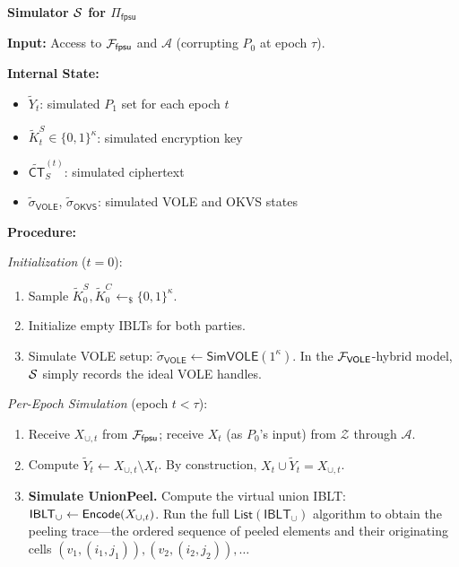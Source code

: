 \documentclass[letterpaper,twocolumn,10pt]{article}
\theoremstyle{definition}
\newcommand{\cA}{\mathcal{A}}\newcommand{\cB}{\mathcal{B}}\newcommand{\cZ}{\mathcal{Z}}
\newcommand{\List}{\mathsf{List}}\newcommand{\uPeel}{\mathsf{uPeel}}
\newcommand{\sample}{\leftarrow_{\$}}\newcommand{\concat}{\|}
\begin{document}
\begin{framed}
\noindent\textbf{Simulator $\mathcal{S}$ for $\Pi_{\mathsf{fpsu}}$}

\smallskip\noindent\textbf{Input:} Access to $\mathcal{F}_{\mathsf{fpsu}}$ and
$\cA$ (corrupting $P_0$ at epoch $\tau$).

\smallskip\noindent\textbf{Internal State:}
\begin{itemize}
\item $\tilde{Y}_t$: simulated $P_1$ set for each epoch $t$
\item $\tilde{K}^S_t \in \{0,1\}^\kappa$: simulated encryption key
\item $\widetilde{\mathsf{CT}}^{(t)}_S$: simulated ciphertext
\item $\tilde{\sigma}_{\mathsf{VOLE}}$, $\tilde{\sigma}_{\mathsf{OKVS}}$:
simulated VOLE and OKVS states
\end{itemize}

\smallskip\noindent\textbf{Procedure:}

\smallskip\noindent\textit{Initialization} ($t = 0$):
\begin{enumerate}
\item Sample $\tilde{K}^S_0, \tilde{K}^C_0 \sample \{0,1\}^\kappa$.
\item Initialize empty IBLTs for both parties.
\item Simulate VOLE setup: $\tilde{\sigma}_{\mathsf{VOLE}} \leftarrow
\textsf{SimVOLE}(1^\kappa)$. In the $\mathcal{F}_{\mathsf{VOLE}}$-hybrid model,
$\mathcal{S}$ simply records the ideal VOLE handles.
\end{enumerate}

\smallskip\noindent\textit{Per-Epoch Simulation} (epoch $t < \tau$):
\begin{enumerate}
\item Receive $X_{\cup,t}$ from $\mathcal{F}_{\mathsf{fpsu}}$; receive $X_t$ (as
$P_0$'s input) from $\cZ$ through $\cA$.
\item Compute $\tilde{Y}_t \leftarrow X_{\cup,t} \setminus X_t$. By
construction, $X_t \cup \tilde{Y}_t = X_{\cup,t}$.
\item \textbf{Simulate UnionPeel.} Compute the virtual union IBLT:
$\mathsf{IBLT}_\cup \leftarrow \mathsf{Encode}(X_{\cup,t})$. Run the full
$\List(\mathsf{IBLT}_\cup)$ algorithm to obtain the peeling trace---the
ordered sequence of peeled elements and their originating cells
$(v_1, (i_1, j_1)), (v_2, (i_2, j_2)), \dots$


\end{enumerate}
\end{framed}
\end{document}
